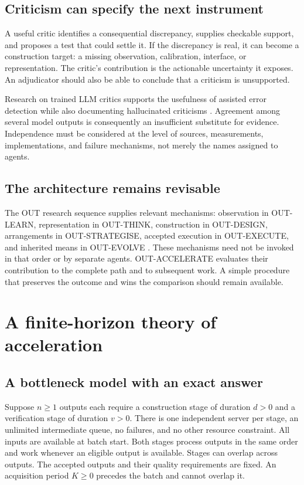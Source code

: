 \documentclass[11pt,letterpaper]{article}
\theoremstyle{remark}\newtheorem{remark}{Remark}[section]
\newcommand{\oa}{{\sffamily OUT-ACCELERATE}}
\begin{document}
\subsection{Criticism can specify the next instrument}
A useful critic identifies a consequential discrepancy, supplies checkable support, and proposes a test that could settle it.
If the discrepancy is real, it can become a construction target: a missing observation, calibration, interface, or representation.
The critic's contribution is the actionable uncertainty it exposes.
An adjudicator should also be able to conclude that a criticism is unsupported.

Research on trained LLM critics supports the usefulness of assisted error detection while also documenting hallucinated criticisms \citep{mcaleese2024critics}.
Agreement among several model outputs is consequently an insufficient substitute for evidence.
Independence must be considered at the level of sources, measurements, implementations, and failure mechanisms, not merely the names assigned to agents.

\subsection{The architecture remains revisable}
The OUT research sequence supplies relevant mechanisms: observation in OUT-LEARN, representation in OUT-THINK, construction in OUT-DESIGN, arrangements in OUT-STRATEGISE, accepted execution in OUT-EXECUTE, and inherited means in OUT-EVOLVE \citep{boucher2026outseries}.
These mechanisms need not be invoked in that order or by separate agents.
\oa{} evaluates their contribution to the complete path and to subsequent work.
A simple procedure that preserves the outcome and wins the comparison should remain available.

\section{A finite-horizon theory of acceleration}\label{sec:model}

\subsection{A bottleneck model with an exact answer}
Suppose $n\ge1$ outputs each require a construction stage of duration $d>0$ and a verification stage of duration $v>0$.
There is one independent server per stage, an unlimited intermediate queue, no failures, and no other resource constraint.
All inputs are available at batch start.
Both stages process outputs in the same order and work whenever an eligible output is available.
Stages can overlap across outputs.
The accepted outputs and their quality requirements are fixed.
An acquisition period $K\ge0$ precedes the batch and cannot overlap it.
\end{document}
